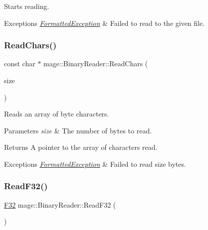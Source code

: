 Starts reading.


\begin{DoxyExceptions}{Exceptions}
{\em \hyperlink{classmage_1_1_formatted_exception}{Formatted\+Exception}} & Failed to read to the given file. \\
\hline
\end{DoxyExceptions}
\hypertarget{classmage_1_1_binary_reader_af1e0e4ab815e23c72ab65fd7c0748d3f}{}\label{classmage_1_1_binary_reader_af1e0e4ab815e23c72ab65fd7c0748d3f} 
\subsubsection{\texorpdfstring{Read\+Chars()}{ReadChars()}}
{\footnotesize\ttfamily const char $\ast$ mage\+::\+Binary\+Reader\+::\+Read\+Chars (\begin{DoxyParamCaption}\item[{size\+\_\+t}]{size }\end{DoxyParamCaption})\hspace{0.3cm}{\ttfamily [protected]}}

Reads an array of byte characters.


\begin{DoxyParams}{Parameters}
{\em size} & The number of bytes to read. \\
\hline
\end{DoxyParams}
\begin{DoxyReturn}{Returns}
A pointer to the array of characters read. 
\end{DoxyReturn}

\begin{DoxyExceptions}{Exceptions}
{\em \hyperlink{classmage_1_1_formatted_exception}{Formatted\+Exception}} & Failed to read {\ttfamily size} bytes. \\
\hline
\end{DoxyExceptions}
\hypertarget{classmage_1_1_binary_reader_abb3c1af4b0e355ea3ff07de5130cc56c}{}\label{classmage_1_1_binary_reader_abb3c1af4b0e355ea3ff07de5130cc56c} 
\subsubsection{\texorpdfstring{Read\+F32()}{ReadF32()}}
{\footnotesize\ttfamily \hyperlink{namespacemage_aa97e833b45f06d60a0a9c4fc22ae02c0}{F32} mage\+::\+Binary\+Reader\+::\+Read\+F32 (\begin{DoxyParamCaption}{ }\end{DoxyParamCaption})\hspace{0.3cm}{\ttfamily [protected]}}

